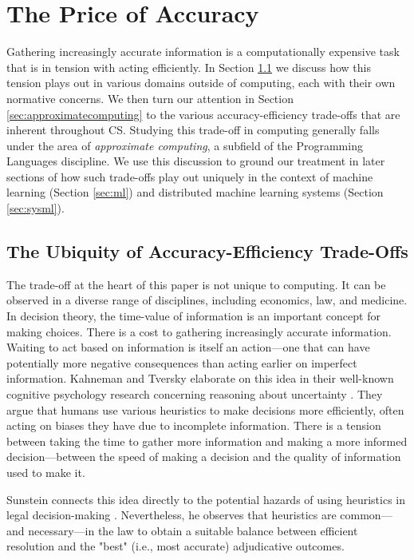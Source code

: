 \documentclass[sigplan,screen]{acmart}
\begin{document}
\section{The Price of Accuracy} \label{sec:price}
Gathering increasingly accurate information is a computationally expensive task that is in tension with acting efficiently. In Section \ref{sec:common} we discuss how this tension plays out in various domains outside of computing, each with their own normative concerns. We then turn our attention in Section \ref{sec:approximatecomputing} to the various accuracy-efficiency trade-offs that are inherent throughout CS. Studying this trade-off in computing generally falls under the area of \emph{approximate computing}, a subfield of the Programming Languages discipline. We use this discussion to ground our treatment in later sections of how such trade-offs play out uniquely in the context of machine learning (Section \ref{sec:ml}) and distributed machine learning systems (Section \ref{sec:sysml}).

\subsection{The Ubiquity of Accuracy-Efficiency Trade-Offs} \label{sec:common}
The trade-off at the heart of this paper is not unique to computing. It can be observed in a diverse range of disciplines, including economics, law, and medicine. In decision theory, the time-value of information is an important concept for making choices. There is a cost to gathering increasingly accurate information. Waiting to act based on information is itself an action---one that can have potentially more negative consequences than acting earlier on imperfect information. Kahneman and Tversky elaborate on this idea in their well-known cognitive psychology research concerning reasoning about uncertainty \cite{kahneman1982uncertainty}. They argue that humans use various heuristics to make decisions more efficiently, often acting on biases they have due to incomplete information. There is a tension between taking the time to gather more information and making a more informed decision---between the speed of making a decision and the quality of information used to make it.

Sunstein connects this idea directly to the potential hazards of using heuristics in legal decision-making \cite{sunstein2002heuristics}. Nevertheless, he observes that heuristics are common---and necessary---in the law to obtain a suitable balance between efficient resolution and the "best" (i.e., most accurate) adjudicative outcomes.
\end{document}
